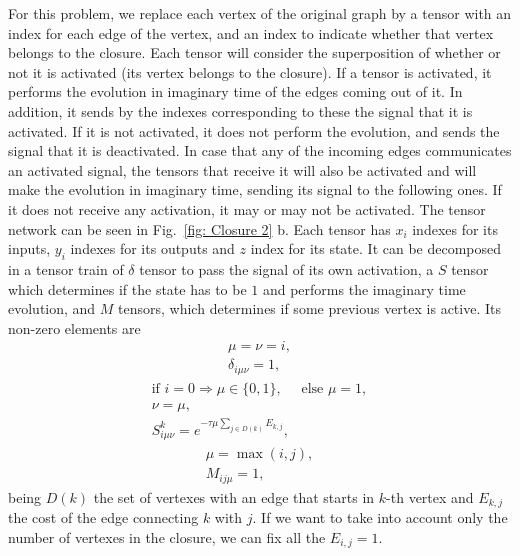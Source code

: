 For this problem, we replace each vertex of the original graph by a tensor with an index for each edge of the vertex, and an index to indicate whether that vertex belongs to the closure. Each tensor will consider the superposition of whether or not it is activated (its vertex belongs to the closure). If a tensor is activated, it performs the evolution in imaginary time of the edges coming out of it. In addition, it sends by the indexes corresponding to these the signal that it is activated. If it is not activated, it does not perform the evolution, and sends the signal that it is deactivated. In case that any of the incoming edges communicates an activated signal, the tensors that receive it will also be activated and will make the evolution in imaginary time, sending its signal to the following ones. If it does not receive any activation, it may or may not be activated. The tensor network can be seen in Fig.~\ref{fig: Closure 2} b. Each tensor has $x_i$ indexes for its inputs, $y_i$ indexes for its outputs and $z$ index for its state. It can be decomposed in a tensor train of $\delta$ tensor to pass the signal of its own activation, a $S$ tensor which determines if the state has to be $1$ and performs the imaginary time evolution, and $M$ tensors, which determines if some previous vertex is active. Its non-zero elements are
\begin{equation}
    \begin{gathered}
    \mu =\nu = i,\\
    \delta_{i\mu\nu} = 1,
    \end{gathered}
\end{equation}
\begin{equation}
    \begin{gathered}
    \text{if } i=0\Rightarrow \mu\in\{0,1\},\quad \text{ else } \mu=1,\\
    \nu = \mu,\\
    S^k_{i\mu\nu} = e^{-\tau \mu\sum_{j\in D(k)} E_{k,j}},
    \end{gathered}
\end{equation}
\begin{equation}
    \begin{gathered}
    \mu =\max(i,j),\\
    M_{ij\mu} = 1,
    \end{gathered}
\end{equation}
being $D(k)$ the set of vertexes with an edge that starts in $k$-th vertex and $E_{k,j}$ the cost of the edge connecting $k$ with $j$. If we want to take into account only the number of vertexes in the closure, we can fix all the $E_{i,j}=1$.




